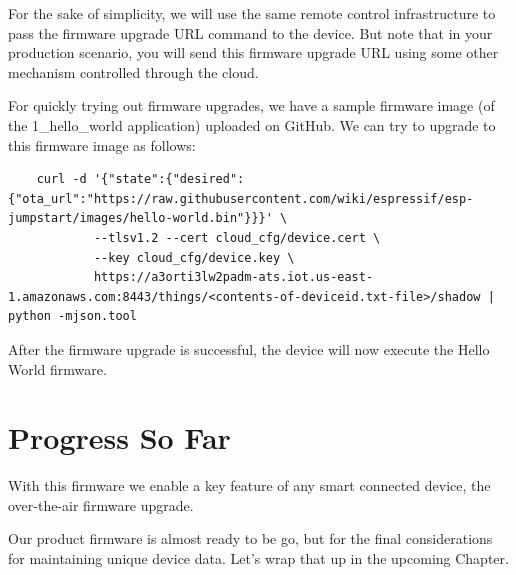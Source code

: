 \documentclass[main.tex]{subfiles}
\begin{document}
For the sake of simplicity, we will use the same remote control infrastructure to pass the firmware upgrade URL command to the device. But note that in your production scenario, you will send this firmware upgrade URL using some other mechanism controlled through the cloud.

For quickly trying out firmware upgrades, we have a sample firmware image (of the 1\_hello\_world application) uploaded on GitHub. We can try to upgrade to this firmware image as follows:

\begin{verbatim}
    curl -d '{"state":{"desired":{"ota_url":"https://raw.githubusercontent.com/wiki/espressif/esp-jumpstart/images/hello-world.bin"}}}' \
            --tlsv1.2 --cert cloud_cfg/device.cert \
            --key cloud_cfg/device.key \
            https://a3orti3lw2padm-ats.iot.us-east-1.amazonaws.com:8443/things/<contents-of-deviceid.txt-file>/shadow | python -mjson.tool
\end{verbatim}

After the firmware upgrade is successful, the device will now execute the Hello World firmware.

\section{Progress So Far}
With this firmware we enable a key feature of any smart connected device, the over-the-air firmware upgrade. 

Our product firmware is almost ready to be go, but for the final considerations for maintaining unique device data. Let's wrap that up in the upcoming Chapter.
\end{document}
